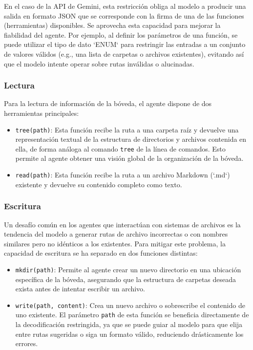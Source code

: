 En el caso de la API de Gemini, esta restricción obliga al modelo a producir una salida en formato JSON que se corresponde con la firma de una de las funciones (herramientas) disponibles. Se aprovecha esta capacidad para mejorar la fiabilidad del agente. Por ejemplo, al definir los parámetros de una función, se puede utilizar el tipo de dato `ENUM` para restringir las entradas a un conjunto de valores válidos (e.g., una lista de carpetas o archivos existentes), evitando así que el modelo intente operar sobre rutas inválidas o alucinadas.

\subsubsection{Lectura}
Para la lectura de información de la bóveda, el agente dispone de dos herramientas principales:
\begin{itemize}
    \item \texttt{tree(path)}: Esta función recibe la ruta a una carpeta raíz y devuelve una representación textual de la estructura de directorios y archivos contenida en ella, de forma análoga al comando \texttt{tree} de la línea de comandos. Esto permite al agente obtener una visión global de la organización de la bóveda.
    \item \texttt{read(path)}: Esta función recibe la ruta a un archivo Markdown (`.md`) existente y devuelve su contenido completo como texto.
\end{itemize}
 
\subsubsection{Escritura}
Un desafío común en los agentes que interactúan con sistemas de archivos es la tendencia del modelo a generar rutas de archivo incorrectas o con nombres similares pero no idénticos a los existentes. Para mitigar este problema, la capacidad de escritura se ha separado en dos funciones distintas:
\begin{itemize}
    \item \texttt{mkdir(path)}: Permite al agente crear un nuevo directorio en una ubicación específica de la bóveda, asegurando que la estructura de carpetas deseada exista antes de intentar escribir un archivo.
    \item \texttt{write(path, content)}: Crea un nuevo archivo o sobrescribe el contenido de uno existente. El parámetro \texttt{path} de esta función se beneficia directamente de la decodificación restringida, ya que se puede guiar al modelo para que elija entre rutas sugeridas o siga un formato válido, reduciendo drásticamente los errores.
\end{itemize}
 
